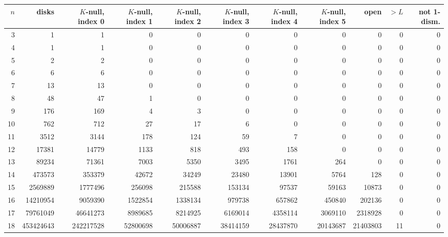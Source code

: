 \begin{tabular}{r r rrrrrr rrr}\toprule
$n$ & disks & $K$-null, index 0 & $K$-null, index 1 & $K$-null, index 2 & $K$-null, index 3 & $K$-null, index 4 & $K$-null, index 5 & open & $>L$ & not 1-dism.\\\midrule
3 & 1 & 1 & 0 & 0 & 0 & 0 & 0 & 0 & 0 & 0\\
4 & 1 & 1 & 0 & 0 & 0 & 0 & 0 & 0 & 0 & 0\\
5 & 2 & 2 & 0 & 0 & 0 & 0 & 0 & 0 & 0 & 0\\
6 & 6 & 6 & 0 & 0 & 0 & 0 & 0 & 0 & 0 & 0\\
7 & 13 & 13 & 0 & 0 & 0 & 0 & 0 & 0 & 0 & 0\\
8 & 48 & 47 & 1 & 0 & 0 & 0 & 0 & 0 & 0 & 0\\
9 & 176 & 169 & 4 & 3 & 0 & 0 & 0 & 0 & 0 & 0\\
10 & 762 & 712 & 27 & 17 & 6 & 0 & 0 & 0 & 0 & 0\\
11 & 3512 & 3144 & 178 & 124 & 59 & 7 & 0 & 0 & 0 & 0\\
12 & 17381 & 14779 & 1133 & 818 & 493 & 158 & 0 & 0 & 0 & 0\\
13 & 89234 & 71361 & 7003 & 5350 & 3495 & 1761 & 264 & 0 & 0 & 0\\
14 & 473573 & 353379 & 42672 & 34249 & 23480 & 13901 & 5764 & 128 & 0 & 0\\
15 & 2569889 & 1777496 & 256098 & 215588 & 153134 & 97537 & 59163 & 10873 & 0 & 0\\
16 & 14210954 & 9059390 & 1522854 & 1338134 & 979738 & 657862 & 450840 & 202136 & 0 & 0\\
17 & 79761049 & 46641273 & 8989685 & 8214925 & 6169014 & 4358114 & 3069110 & 2318928 & 0 & 0\\
18 & 453424643 & 242217528 & 52800698 & 50006887 & 38414159 & 28437870 & 20143687 & 21403803 & 11 & 0\\
\bottomrule\end{tabular}
